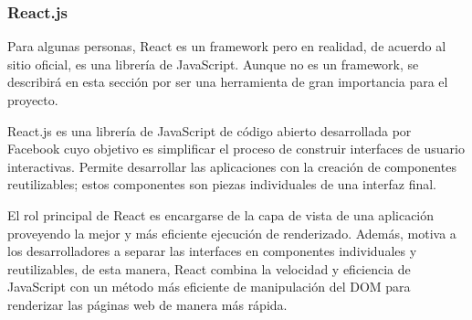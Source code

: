 \subsubsection{React.js}
Para algunas personas, React es un framework pero en realidad, de acuerdo al sitio oficial, es una librería de JavaScript. Aunque no es un framework, se describirá en esta sección por ser una herramienta de gran importancia para el proyecto.

React.js es una librería de JavaScript de código abierto desarrollada por Facebook cuyo objetivo es simplificar el proceso de construir interfaces de usuario interactivas. Permite desarrollar las aplicaciones con la creación de componentes reutilizables; estos componentes son piezas individuales de una interfaz final.

El rol principal de React es encargarse de la capa de vista de una aplicación proveyendo la mejor y más eficiente ejecución de renderizado. Además, motiva a los desarrolladores a separar las interfaces en componentes individuales y reutilizables, de esta manera, React combina la velocidad y eficiencia de JavaScript con un método más eficiente de manipulación del DOM para renderizar las páginas web de manera más rápida.